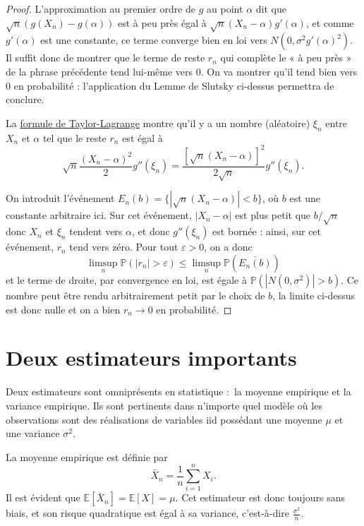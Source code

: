 \documentclass[
  10,
  letterpaper,
  DIV=11,
  numbers=noendperiod]{scrreport}
\theoremstyle{plain}
\theoremstyle{definition}
\theoremstyle{plain}
\theoremstyle{definition}
\theoremstyle{definition}
\theoremstyle{plain}
\theoremstyle{remark}
\begin{document}
\begin{proof}

L'approximation au premier ordre de \(g\) au point \(\alpha\) dit que
\(\sqrt{n}(g(X_n) - g(\alpha))\) est à peu près égal à
\(\sqrt{n}(X_n - \alpha)g'(\alpha)\), et comme \(g'(\alpha)\) est une
constante, ce terme converge bien en loi vers
\(N(0,\sigma^2 g'(\alpha)^2)\). Il suffit donc de montrer que le terme
de reste \(r_n\) qui complète le « à peu près » de la phrase précédente
tend lui-même vers 0. On va montrer qu'il tend bien vers 0 en
probabilité : l'application du Lemme de Slutsky ci-dessus permettra de
conclure.

La
\href{https://fr.wikipedia.org/wiki/Th\%C3\%A9or\%C3\%A8me_de_Taylor}{formule
de Taylor-Lagrange} montre qu'il y a un nombre (aléatoire) \(\xi_n\)
entre \(X_n\) et \(\alpha\) tel que le reste \(r_n\) est égal à
\[\sqrt{n}\frac{(X_n - \alpha)^2}{2}g''(\xi_n) = \frac{[\sqrt{n}(X_n - \alpha)]^2}{2\sqrt{n}}g''(\xi_n). \]

On introduit l'événement \(E_n(b) = \{|\sqrt{n}(X_n - \alpha)| < b\}\),
où \(b\) est une constante arbitraire ici. Sur cet événement,
\(|X_n - \alpha|\) est plus petit que \(b/\sqrt{n}\) donc \(X_n\) et
\(\xi_n\) tendent vers \(\alpha\), et donc \(g''(\xi_n)\) est bornée :
ainsi, sur cet événement, \(r_n\) tend vers zéro. Pour tout
\(\varepsilon >0\), on a donc
\[ \limsup_n \mathbb{P}(|r_n|>\varepsilon) \leqslant \limsup_n \mathbb{P}(\overline{E_n(b)})\]
et le terme de droite, par convergence en loi, est égale à
\(\mathbb{P}(|N(0,\sigma^2)|>b)\). Ce nombre peut être rendu
arbitrairement petit par le choix de \(b\), la limite ci-dessus est donc
nulle et on a bien \(r_n \to 0\) en probabilité.

\end{proof}

\hypertarget{deux-estimateurs-importants}{%
\section{Deux estimateurs
importants}\label{deux-estimateurs-importants}}

Deux estimateurs sont omniprésents en statistique :~la moyenne empirique
et la variance empirique. Ils sont pertinents dans n'importe quel modèle
où les observations sont des réalisations de variables iid possédant une
moyenne \(\mu\) et une variance \(\sigma^2\).

La moyenne empirique est définie par
\[ \bar{X}_n = \frac{1}{n}\sum_{i=1}^n X_i.\] Il est évident que
\(\mathbb{E}[\bar{X}_n] = \mathbb{E}[X] = \mu\). Cet estimateur est donc
toujours sans biais, et son risque quadratique est égal à sa variance,
c'est-à-dire \(\frac{\sigma^2}{n}\).
\end{document}

